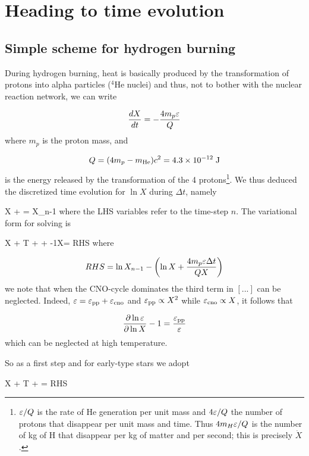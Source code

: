 \section{Heading to time evolution}

\subsection{Simple scheme for hydrogen burning}

During hydrogen burning, heat is basically produced by the transformation of
protons into alpha particles ($^4$He nuclei) and thus, not to bother with
the nuclear reaction network, we can write

\[ \frac{d X}{dt} = -\frac{4m_p\varepsilon}{Q}\]
where $m_p$ is the proton mass, and 

\[ Q= (4m_p-m_{\rm He})c^2 = 4.3\times10^{-12}\; {\rm J}\]
is the energy released by the transformation of the 4
protons\footnote{$\varepsilon/Q$ is the rate of He generation per unit mass and
$4\varepsilon/Q$ the number of protons that disappear per unit mass and time.
Thus $4m_H\varepsilon/Q$ is the number of kg of H that disappear per kg of
matter and per second; this is precisely $\dot{X}$.}. We thus deduced
the discretized time evolution for $\ln X$ during $\Delta t$, namely

\beq \ln X +  = \ln X_{n-1}
where the LHS variables refer to the time-step $n$. The variational form for
solving  is

\beq \delta\ln X + \lc
\lp{}\rp\delta\ln T +
\lp\frac{\partial\ln\eps}{\partial\ln\rho}\rp\delta\ln \rho +
\lp{}-1\rp\delta\ln X\rc = RHS
\eeq
where

\[ RHS = \ln X_{n-1} -\left(\ln X + \frac{4m_p\varepsilon\Delta t}{QX}\right)\]
we note that when the CNO-cycle dominates the third term in $[...]$ can be
neglected. Indeed, $\varepsilon = \varepsilon_{\rm pp}+\varepsilon_{\rm cno}$ and $\varepsilon_{\rm
pp}\propto X^2$ while $\varepsilon_{\rm cno}\propto X$, it follows that

\[ \frac{\partial\ln\varepsilon}{\partial\ln X}-1 = \frac{\varepsilon_{\rm pp}}{\varepsilon}\]
which can be neglected at high temperature.

So as a first step and for early-type stars we adopt

\beq
\delta\ln X + \lc
\lp{}\rp\delta\ln T +
\lp\frac{\partial\ln\eps}{\partial\ln\rho}\rp\delta\ln \rho
\rc = RHS
\eeq
